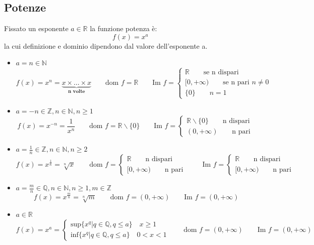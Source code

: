 \documentclass[11pt,a4paper,notitlepage]{report}
\let\numberset\mathbb
\newcommand{\N}{\numberset{N}}
\newcommand{\Z}{\numberset{Z}}
\newcommand{\Q}{\numberset{Q}}
\newcommand{\R}{\numberset{R}}
\newcommand{\dom}{\text{dom }}
\newcommand{\im}{\text{Im }}
\begin{document}
\subsection{Potenze}
Fissato un esponente $a \in \R$ la funzione potenza è:
\[f(x)=x^a\]
la cui definizione e dominio dipendono dal valore dell’esponente a.
\begin{itemize}
\item $a=n \in \N$
\[f(x)=x^n= \underbrace{x \times \dots \times x}_{\textbf{n volte}} \qquad \dom f=\R \qquad \im f= 
\begin{cases}
		\R \qquad \text{se n dispari} \\
		[0,+\infty )  \qquad \text{se n pari } n \neq 0 \\
		\{0\}  \qquad n = 1
\end{cases}\]

\item $a=-n\in \Z , n\in \N ,n \geq 1$
\[f(x)=x^{-n}=\frac{1}{x^n} \qquad \dom f = \R \backslash \{0\} \qquad \im f=
\begin{cases}
		\R \backslash \{0\} \qquad \text{n dispari} \\
		(0,+\infty )  \qquad \text{n pari }
\end{cases}
\]
\item $a=\frac{1}{n} \in \Z , n\in \N ,n \geq 2$
\[f(x)=x^{\frac{1}{n}}=\sqrt[n]{x} \qquad 
\dom f = 
\begin{cases}
		\R \qquad \text{n dispari} \\
		[0,+\infty )  \qquad \text{n pari }
\end{cases}
\qquad \im f=
\begin{cases}
		\R \qquad \text{n dispari} \\
		[0,+\infty) \qquad \text{n pari }
\end{cases}
\]

\item $a=\frac{m}{n} \in \Q , n\in \N ,n \geq 1 , m \in \Z$
\[f(x)=x^{\frac{m}{n}}=\sqrt[n]{m} \qquad 
\dom f = (0,+\infty)
\qquad \im f=(0,+\infty)\]

\item $a \in \R$
\[f(x)=x^a=
\begin{cases}
	\text{sup}\{x^q | q \in \Q , q \leq a\} \quad x \geq 1 \\
	\text{inf} \{x^q | q\in \Q , q \leq a\} \quad 0 < x < 1
\end{cases}
\qquad
\dom f = (0, + \infty)
\qquad
\im f = (0, + \infty)
\]


\end{itemize}
\end{document}
